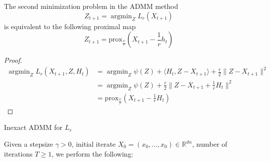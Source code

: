 \begin{itemize}
\begin{lemma}\label{lemma: equivalence of admm step 2 and prox}
The second minimization problem in the ADMM method 
\begin{equation}
    Z_{t+1} = \mathop{\arg \min}_Z L_r (X_{t+1})
\end{equation}
is equivalent to the following proximal map 
\begin{equation}
    Z_{t+1} = \text{prox}_{\frac{\psi}{r}}(X_{t+1} - \frac{1}{r} h_t) 
\end{equation}
\end{lemma}
\begin{proof}
\begin{equation}
    \begin{split}
         \mathop{\arg \min}_Z L_r (X_{t+1},Z,H_t)
         &=  \mathop{\arg \min}_Z \psi(Z) + \langle H_t, Z - X_{t+1}\rangle+ \frac{r}{2} \| Z- X_{t+1} \|^2 \\
         & =  \mathop{\arg \min}_Z  \psi(Z) + \frac{r}{2} \| Z - X_{t+1} + \frac{1}{r}H_t  \|^2 \\
         & = \text{prox}_{\frac{\psi}{r}} (X_{t+1} - \frac{1}{r} H_t)
    \end{split}
\end{equation}
\end{proof}

\begin{algorithm}
\caption{Inexact ADMM for $L_r$}\label{alg:ADMM inexact}
Given a stepsize $\gamma > 0$, initial iterate $X_0 = (x_0, \dots, x_0) \in \mathbb{R}^{dn}$, number of iterations $T \geq 1$, we perform the following:  
\begin{algorithmic}
    \EndFor
\EndFor
\end{algorithmic}
\end{algorithm}





\end{itemize}
